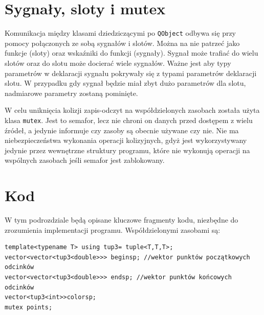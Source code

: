 \section{Sygnały, sloty i mutex}
\label{sec::sig_slot}
Komunikacja między klasami dziedziczącymi po \texttt{QObject} odbywa się przy pomocy połączonych ze sobą sygnałów i slotów. Można na nie patrzeć jako funkcje (sloty) oraz wskaźniki do funkcji (sygnały). Sygnał może trafiać do wielu slotów oraz do slotu może docierać wiele sygnałów. Ważne jest aby typy parametrów w deklaracji sygnału pokrywały się z typami parametrów deklaracji slotu. W przypadku gdy sygnał będzie miał zbyt dużo parametrów dla slotu, nadmiarowe parametry zostaną pominięte.

W celu uniknięcia kolizji zapis-odczyt na współdzielonych zasobach została użyta klasa \texttt{mutex}. Jest to semafor, lecz nie chroni on danych przed dostępem z wielu źródeł, a jedynie informuje czy zasoby są obecnie używane czy nie. Nie ma niebezpieczeństwa wykonania operacji kolizyjnych, gdyż jest wykorzystywany jedynie przez wewnętrzne struktury programu, które nie wykonują operacji na wspólnych zasobach jeśli semafor jest zablokowany.

\section{Kod}
\label{sec::kod}
W tym podrozdziale będą opisane kluczowe fragmenty kodu, niezbędne do zrozumienia implementacji programu. Współdzielonymi zasobami są:
\begin{lstlisting}
template<typename T> using tup3= tuple<T,T,T>;
vector<vector<tup3<double>>> beginsp; //wektor punktów początkowych odcinków
vector<vector<tup3<double>>> endsp; //wektor punktów końcowych odcinków
vector<tup3<int>>colorsp;
mutex points;
\end{lstlisting}

